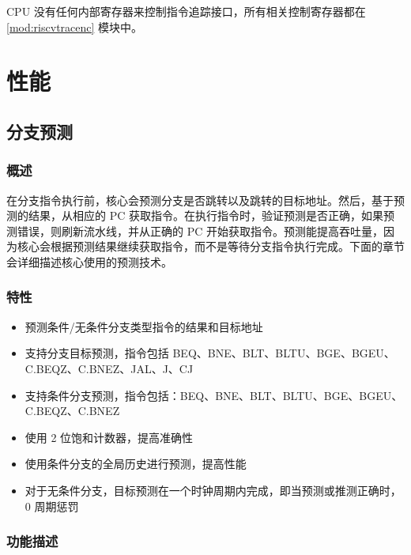 \documentclass[main\_\_CN.tex]{subfiles}
\begin{document}
CPU 没有任何内部寄存器来控制指令追踪接口，所有相关控制寄存器都在 \ref{mod:riscvtracenc} \textit{} 模块中。

\newpage
\section{性能}
\label{sec:riscvcpu-perf-enhancements}


\subsection{分支预测}
\label{sec:riscvcpu-perf-bp}

\subsubsection{概述}
\label{sec:riscvcpu-perf-bp-overview}
在分支指令执行前，核心会预测分支是否跳转以及跳转的目标地址。然后，基于预测的结果，从相应的 PC 获取指令。在执行指令时，验证预测是否正确，如果预测错误，则刷新流水线，并从正确的 PC 开始获取指令。预测能提高吞吐量，因为核心会根据预测结果继续获取指令，而不是等待分支指令执行完成。下面的章节会详细描述核心使用的预测技术。

\subsubsection{特性}
\label{sec:riscvcpu-perf-bp-features}
\begin{itemize}
    \item 预测条件/无条件分支类型指令的结果和目标地址
    \item 支持分支目标预测，指令包括 BEQ、BNE、BLT、BLTU、BGE、BGEU、C.BEQZ、C.BNEZ、JAL、J、CJ
    \item 支持条件分支预测，指令包括：BEQ、BNE、BLT、BLTU、BGE、BGEU、C.BEQZ、C.BNEZ
    \item 使用 2 位饱和计数器，提高准确性
    \item 使用条件分支的全局历史进行预测，提高性能
    \item 对于无条件分支，目标预测在一个时钟周期内完成，即当预测或推测正确时，0 周期惩罚
\end{itemize}

\subsubsection{功能描述}
\label{sec:riscvcpu-perf-bp-func-descr}
\end{document}
